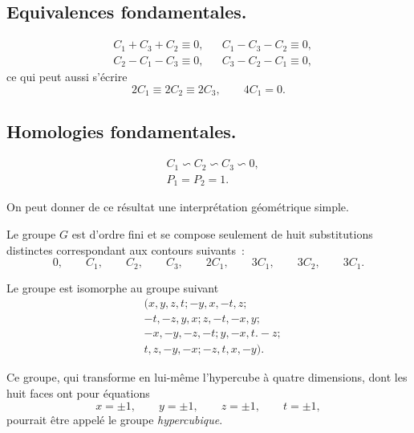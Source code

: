 \documentclass{article}
\begin{document}
\subsection*{Equivalences fondamentales.}

\[ \begin{aligned} &C_{1} + C_{3} + C_{2} \equiv 0, &&C_{1} - C_{3} - C_{2} \equiv 0,\\ &C_{2} - C_{1} - C_{3} \equiv 0, &&C_{3} - C_{2} - C_{1} \equiv 0, \end{aligned} \]
ce qui peut aussi s'écrire
\[ 2C_{1} \equiv 2C_{2} \equiv 2C_{3}, \qquad 4C_{1} = 0. \]

\subsection*{Homologies fondamentales.}

\[ \begin{aligned} &C_{1} \backsim C_{2} \backsim C_{3} \backsim 0,\\ &P_{1} = P_{2} = 1. \end{aligned} \]

On peut donner de ce résultat une interprétation géométrique simple.

Le groupe $G$ est d'ordre fini et se compose seulement de huit substitutions
distinctes correspondant aux contours suivants~:
\[ 0, \qquad C_{1}, \qquad C_{2}, \qquad C_{3}, \qquad 2C_{1}, \qquad 3C_{1}, \qquad 3C_{2}, \qquad 3C_{1}. \]

Le groupe est isomorphe au groupe suivant
\[ \begin{aligned} &(x, y, z, t; -y, x, -t, z;\\ &-t, -z, y, x; z, -t, -x, y;\\ &-x, -y, -z, -t; y, -x, t. -z;\\ &t, z, -y, -x; -z, t, x, -y). \end{aligned} \]

Ce groupe, qui transforme en lui-même l'hypercube à quatre dimensions, dont les huit faces ont pour équations
\[ x = \pm 1, \qquad y = \pm 1, \qquad z = \pm 1, \qquad t = \pm 1, \]
pourrait être appelé le groupe \emph{hypercubique}.
\end{document}
